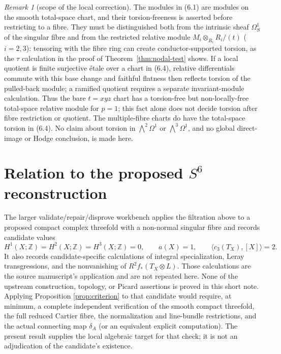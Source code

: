 \documentclass[11pt]{amsart}
\newcommand{\Z}{\mathbb Z}
\theoremstyle{plain}
\theoremstyle{definition}
\theoremstyle{remark}
\newtheorem{remark}[theorem]{Remark}
\begin{document}
\begin{remark}[scope of the local correction]
\label{rem:relative-local-scope}
The modules in (6.1) are modules on the smooth total-space chart, and their
torsion-freeness is asserted before restricting to a fibre.  They must be
distinguished both from the intrinsic sheaf $\Omega^1_S$ of the singular
fibre and from the restricted relative module
$M_i\otimes_{R_i}R_i/(t)$ ($i=2,3$): tensoring with the fibre ring can create
conductor-supported torsion, as the $\tau$ calculation in the proof of
Theorem~\ref{thm:nodal-test} shows.  If a local quotient is finite
surjective \'{e}tale over a chart in (6.4), relative differentials commute with
this base change and faithful flatness then reflects torsion of the pulled-back
module; a ramified quotient
requires a separate invariant-module calculation.  Thus the bare $t=xyz$
chart has a torsion-free but non-locally-free total-space relative module for
$p=1$; this fact alone does not decide torsion after fibre restriction or
quotient.  The multiple-fibre charts do have the total-space torsion in
(6.4).  No claim about torsion in $\bigwedge^2\Omega^1$ or
$\bigwedge^3\Omega^1$, and no global direct-image or Hodge conclusion, is
made here.
\end{remark}

\section{\texorpdfstring{Relation to the proposed $S^6$ reconstruction}{Relation to the proposed S6 reconstruction}}

The larger validate/repair/disprove workbench applies the filtration above to
a proposed compact complex threefold with a non-normal singular fibre and
records candidate values
\[
 H^1(X;\Z)=H^2(X;\Z)=H^3(X;\Z)=0,
 \qquad a(X)=1,
 \qquad \langle c_3(T_X),[X]\rangle=2.
 \tag{7.1}
\]
It also records candidate-specific calculations of integral specialization,
Leray transgressions, and the nonvanishing of
$R^2f_*(T_X\otimes L)$.  Those calculations are the source manuscript's
application and are not repeated here.  None of the upstream construction,
topology, or Picard assertions is proved in this short note.  Applying Proposition
\ref{prop:criterion} to that candidate would require, at minimum, a complete
independent verification of the smooth compact threefold, the full reduced
Cartier fibre, the normalization and line-bundle restrictions, and the
actual connecting map $\delta_A$ (or an equivalent explicit computation).
The present result supplies the local algebraic target for that check; it is
not an adjudication of the candidate's existence.
\end{document}
